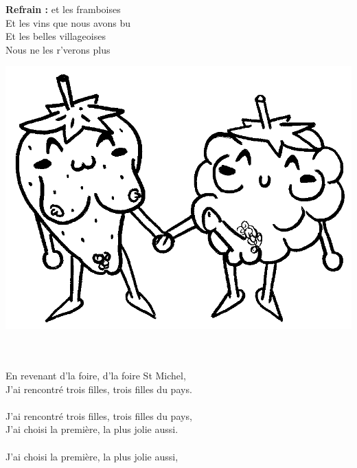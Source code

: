
\noindent
\begin{minipage}{0.65\textwidth}
\textbf{Refrain :}
 et les framboises
\\Et les vins que nous avons bu
\\Et les belles villageoises
\\Nous ne les r'verons plus
\end{minipage}
\begin{minipage}{0.3\textwidth}
\includegraphics[width=1\textwidth]{images/fraises_framboises.png}
\end{minipage}
\\\\En revenant d'la foire, d'la foire St Michel,
\\J'ai rencontré trois filles, trois filles du pays.
\\\\J'ai rencontré trois filles, trois filles du pays,
\\J'ai choisi la première, la plus jolie aussi.
\\\\J'ai choisi la première, la plus jolie aussi,
